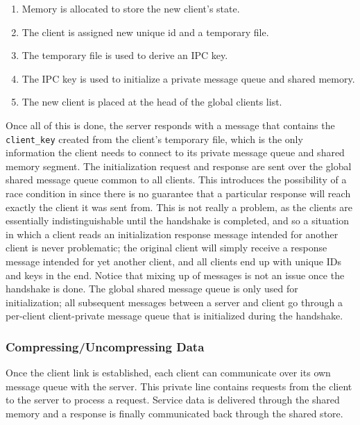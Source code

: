 \documentclass[paper=a4,fontsize=11pt]{report} %
\numberwithin{equation}{section} %
\numberwithin{figure}{section} %
\numberwithin{table}{section} %
\begin{document}
\begin{enumerate}
\item Memory is allocated to store the new client's state.
\item The client is assigned new unique id and a temporary file.
\item The temporary file is used to derive an IPC key.
\item The IPC key is used to initialize a private message queue and shared memory.
\item The new client is placed at the head of the global clients list.
\end{enumerate}

Once all of this is done, the server responds with a message that contains the \texttt{client\_key} created from the client's temporary file, which is the only information the client needs to connect to its private message queue and shared memory segment. The initialization request and response are sent over the global shared message queue common to all clients. This introduces the possibility of a race condition in since there is no guarantee that a particular response will reach exactly the client it was sent from. This is not really a problem, as the clients are essentially indistinguishable until the handshake is completed, and so a situation in which a client reads an initialization response message intended for another client is never problematic; the original client will simply receive a response message intended for yet another client, and all clients end up with unique IDs and keys in the end. Notice that mixing up of messages is not an issue once the handshake is done. The global shared message queue is only used for initialization; all subsequent messages between a server and client go through a per-client client-private message queue that is initialized during the handshake.

\subsubsection{Compressing/Uncompressing Data}
Once the client link is established, each client can communicate over its own message queue with the server. This private line contains requests from the client to the server to process a request. Service data is delivered through the shared memory and a response is finally communicated back through the shared store.
\end{document}

